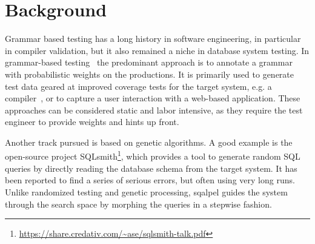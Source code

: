 \documentclass{cidr-2019}
\begin{document}
\section{Background}\label{Background}


Grammar based testing has a long history in software engineering, in
particular in compiler validation, but it also remained a niche in
database system testing. In grammar-based
testing~\cite{10.1007/11754008_2,ZAMLI20111741} the predominant
approach is to annotate a grammar with probabilistic weights on the
productions. It is primarily used to generate test data geared at
improved coverage tests for the target system,
e.g. a compiler~\cite{10.1007/978-3-642-41707-8_2}, or to capture a user
interaction with a web-based application. These approaches can be
considered static and labor intensive, as they require the test
engineer to provide weights and hints up front.

Another track pursued is based on genetic algorithms. A good example
is the open-source project
SQLsmith\footnote{\url{https://share.credativ.com/~ase/sqlsmith-talk.pdf}},
which provides a tool to generate random SQL queries by directly
reading the database schema from the target system. It has been
reported to find a series of serious errors, but often using very long
runs. Unlike randomized testing and genetic processing, {\sc sqalpel} guides the
system through the search space by morphing the queries in a stepwise
fashion.
\end{document}
